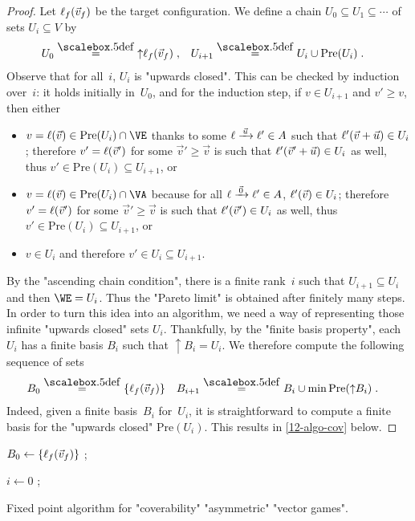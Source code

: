 \begin{proof}
Let $\ell_f(\vec v_f)$ be the target configuration.  We define a
chain $U_0\subseteq U_1\subseteq\cdots$ of sets $U_i\subseteq V$ by
\begin{align*}
  U_0&\eqdef{\uparrow}\loc_f(\vec v_f)\;,&
  U_{i+1}&\eqdef U_i\cup\mathrm{Pre}(U_i)\;.
\end{align*}
Observe that for all~$i$, $U_i$ is "upwards closed".  This can be
checked by induction over~$i$: it holds initially in~$U_0$, and for
the induction step, if $v\in U_{i+1}$ and $v'\geq v$, then either
\begin{itemize}
\item $v=\loc(\vec v)\in\mathrm{Pre}(U_i)\cap\VE$ thanks to some
  $\loc\step{\vec u}\loc'\in\Act$ such that
  $\ell'(\vec v+\vec u)\in U_i$; therefore $v'=\ell(\vec v')$ for some
  $\vec v'\geq \vec v$ is such that $\ell'(\vec v'+\vec u)\in U_i$ as
  well, thus $v'\in \mathrm{Pre}(U_i)\subseteq U_{i+1}$, or
\item $v=\loc(\vec v)\in\mathrm{Pre}(U_i)\cap\VA$ because for all
  $\loc\step{\vec 0}\loc'\in\Act$, $\ell'(\vec v)\in U_i$; therefore
  $v'=\ell(\vec v')$ for some $\vec v'\geq \vec v$ is such that
  $\ell'(\vec v')\in U_i$ as well, thus
  $v'\in \mathrm{Pre}(U_i)\subseteq U_{i+1}$, or
\item $v\in U_i$ and therefore $v'\in U_i\subseteq U_{i+1}$.
\end{itemize}

By the "ascending chain condition", there is a finite rank~$i$ such
that $U_{i+1}\subseteq U_i$ and then $\WE=U_i$.  Thus the
"Pareto limit" is obtained after finitely many steps.
In order to turn this idea into an algorithm, we need a way of
representing those infinite "upwards closed" sets $U_i$.  Thankfully,
by the "finite basis property", each $U_i$ has a finite basis $B_i$
such that ${\uparrow}B_i=U_i$.  We therefore compute the following
sequence of sets
\begin{align*}
  B_0&\eqdef\{\loc_f(\vec v_f)\}&B_{i+1}&\eqdef
                                       B_i\cup\min\mathrm{Pre}({\uparrow}B_i)\;.
\end{align*}
Indeed, given a finite basis~$B_i$ for~$U_i$, it is straightforward to
compute a finite basis for the "upwards closed" $\mathrm{Pre}(U_i)$.
This results in \cref{12-algo-cov} below.
\end{proof}

\begin{algorithm}

$B_0 \leftarrow \{\ell_f(\vec v_f)\}$ ;

$i \leftarrow 0$ ;
     

\caption{Fixed point algorithm for "coverability" "asymmetric" "vector
  games".}
\label{12-algo-cov}
\end{algorithm}

